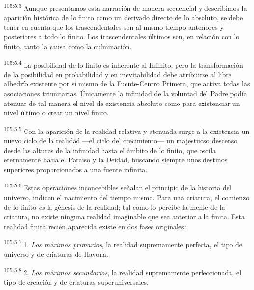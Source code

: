 \documentclass[twoside, 11pt]{book}
\begin{document}
\par
\textsuperscript{105:5.3} Aunque presentamos esta narración de manera secuencial y describimos la aparición histórica de lo finito como un derivado directo de lo absoluto, se debe tener en cuenta que los trascendentales son al mismo tiempo anteriores y posteriores a todo lo finito. Los trascendentales últimos son, en relación con lo finito, tanto la causa como la culminación.

\par
\textsuperscript{105:5.4} La posibilidad de lo finito es inherente al Infinito, pero la transformación de la posibilidad en probabilidad y en inevitabilidad debe atribuirse al libre albedrío existente por sí mismo de la Fuente-Centro Primera, que activa todas las asociaciones triunitarias. Únicamente la infinidad de la voluntad del Padre podía atenuar de tal manera el nivel de existencia absoluto como para existenciar un nivel último o crear un nivel finito.

\par
\textsuperscript{105:5.5} Con la aparición de la realidad relativa y atenuada surge a la existencia un nuevo ciclo de la realidad ---el ciclo del crecimiento--- un majestuoso descenso desde las alturas de la infinidad hasta el ámbito de lo finito, que oscila eternamente hacia el Paraíso y la Deidad, buscando siempre unos destinos superiores proporcionados a una fuente infinita.

\par
\textsuperscript{105:5.6} Estas operaciones inconcebibles señalan el principio de la historia del universo, indican el nacimiento del tiempo mismo. Para una criatura, el comienzo de lo finito \textit{es} la génesis de la realidad; tal como lo percibe la mente de la criatura, no existe ninguna realidad imaginable que sea anterior a la finita. Esta realidad finita recién aparecida existe en dos fases originales:

\par
\textsuperscript{105:5.7} 1. \textit{Los máximos primarios}, la realidad supremamente perfecta, el tipo de universo y de criaturas de Havona.

\par
\textsuperscript{105:5.8} 2. \textit{Los máximos secundarios}, la realidad supremamente perfeccionada, el tipo de creación y de criaturas superuniversales.
\end{document}
